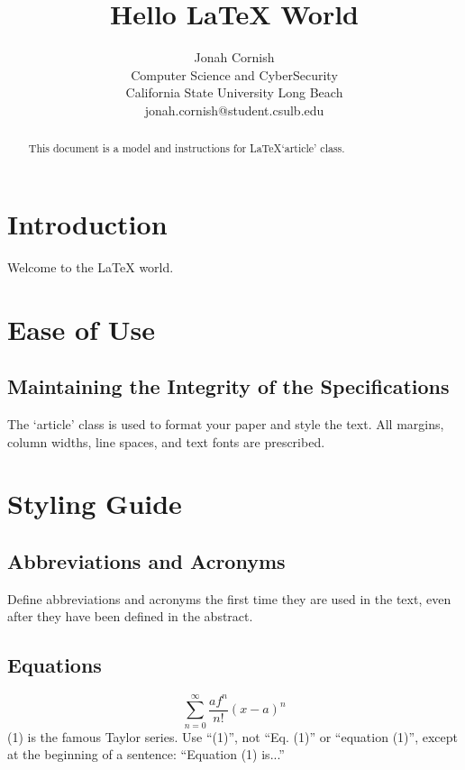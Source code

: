\documentclass{article}
\begin{document}
\title{Hello \LaTeX\xspace World}

\author{Jonah Cornish\\
Computer Science and CyberSecurity\\
California State University Long Beach\\
{\selectfont
jonah.cornish@student.csulb.edu}}
\date{}

\maketitle

\begin{abstract}
This document is a model and instructions for \LaTeX\xspace `article' class.
\end{abstract}

\section{Introduction}
Welcome to the \LaTeX\xspace world.

\section{Ease of Use}

\subsection{Maintaining the Integrity of the Specifications}
The `article' class is used to format your paper and style the text. All margins, column widths, line spaces, and text fonts are prescribed.

\section{Styling Guide}

\subsection{Abbreviations and Acronyms}
Define abbreviations and acronyms the first time they are used in the text, 
even after they have been defined in the abstract.

\subsection{Equations}
\begin{equation}
\sum_{n=0}^{\infty}\frac{af^n}{n!}{(x-a)}^n
\label{Taylor}
\end{equation}
(1) is the famous Taylor series. Use ``(1)'', not ``Eq. (1)'' or ``equation (1)'',
except at the beginning of a sentence: ``Equation (1) is...''
\end{document}
